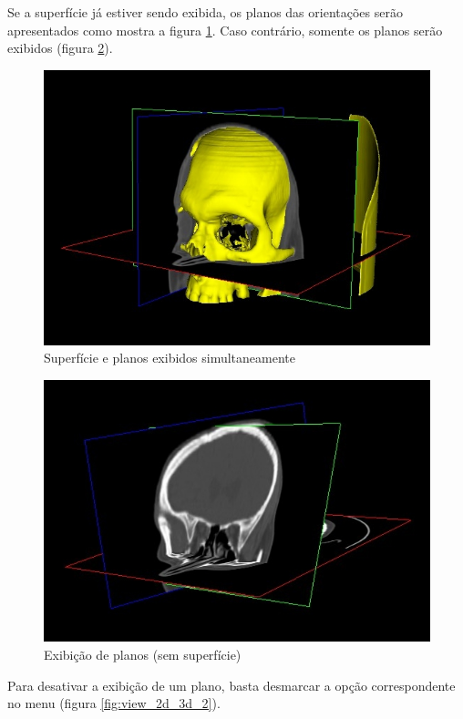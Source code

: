 \newpage


Se a superfície já estiver sendo exibida, os planos das orientações serão apresentados como mostra
a figura \ref{fig:3d_planes}. Caso contrário, somente os planos serão exibidos
(figura \ref{fig:only_2d_planes}).

\begin{figure}[!htb]
\centering
\includegraphics[scale=0.5]{../user_guide_figures/invesalius_screen/3d_planes.jpg}
\caption{Superfície e planos exibidos simultaneamente}
\label{fig:3d_planes}
\end{figure}

\begin{figure}[!htb]
\centering
\includegraphics[scale=0.55]{../user_guide_figures/invesalius_screen/only_2d_planes.jpg}
\caption{Exibição de planos (sem superfície)}
\label{fig:only_2d_planes}
\end{figure}

\newpage

Para desativar a exibição de um plano, basta desmarcar a opção correspondente no menu
(figura \ref{fig:view_2d_3d_2}).

